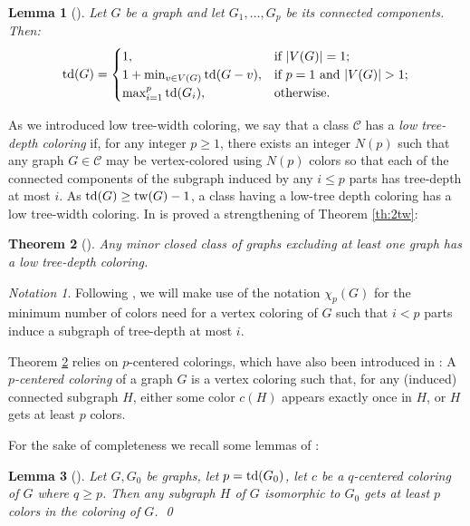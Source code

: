 \documentclass[a4paper]{amsart}
\newtheorem{theorem}{Theorem}[section]
\newtheorem{lemma}[theorem]{Lemma}
\theoremstyle{definition}
\theoremstyle{remark}
\newtheorem{notation}[definition]{Notation}
\DeclareMathOperator\depth{{\rm td}}
\DeclareMathOperator\tw{{\rm tw}}
\begin{document}
\begin{lemma}[\cite{Taxi_tdepth}]
\label{lem:recur}
Let $G$ be a graph and let $G_1,\dots,G_p$ be its connected components. Then:
\begin{equation*}
\depth(G)=\begin{cases}
1,&\text{if }|V(G)|=1;\\
1+\min_{v\in V(G)}\depth(G-v),&\text{if }p=1\text{ and }|V(G)|>1;\\
\max_{i=1}^p \depth(G_i),&\text{otherwise.}
\end{cases}
\end{equation*}
\end{lemma}

As we introduced low tree-width coloring, we say that
a class $\mathcal C$ has a {\em low tree-depth coloring} if, for any
integer $p\geq 1$, there exists an integer $N(p)$ such that any graph
$G\in\mathcal C$ may be vertex-colored using $N(p)$ colors so that
each of the connected components of the subgraph induced
by any $i\leq p$ parts has tree-depth at most $i$.
As $\depth(G)\geq\tw(G)-1$, a class having a low-tree depth coloring
has a low tree-width coloring.
In \cite{Taxi_tdepth} is proved a strengthening of
Theorem \ref{th:2tw}:
\begin{theorem}[\cite{Taxi_tdepth}]
\label{th:ltd}
Any minor closed class of graphs excluding at least one graph has a
low tree-depth coloring.
\end{theorem}
\begin{notation}
Following \cite{Taxi_tdepth}, we will make use of the notation
$\chi_p(G)$ for the minimum number of colors need for a vertex
coloring of $G$ such that $i<p$ parts induce a subgraph of tree-depth
at most $i$.
\end{notation}

Theorem \ref{th:ltd} relies on $p$-centered colorings, which have also been
introduced in \cite{Taxi_tdepth}:
A {\em $p$-centered coloring} of a graph $G$ is a vertex coloring
such that, for any (induced) connected subgraph $H$, either some color $c(H)$
appears exactly once in $H$, or $H$ gets at least $p$ colors.

For the sake of completeness we recall some lemmas of \cite{Taxi_tdepth}:

\begin{lemma}[\cite{Taxi_tdepth}]
\label{lem:centerlocal}
Let $G, G_0$ be graphs, let $p=\depth(G_0)$, let $c$ be a
$q$-centered coloring of $G$ where $q\geq p$.
Then any subgraph $H$ of $G$ isomorphic to $G_0$ gets at least $p$
colors in the coloring of $G$.
\qed
\end{lemma}
\end{document}
